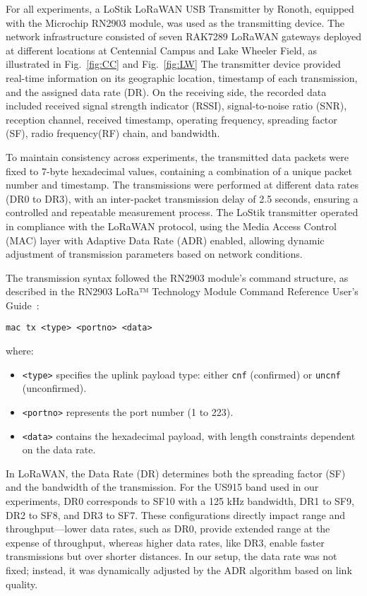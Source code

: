 \documentclass[journal]{IEEEtran}
\begin{document}
For all experiments, a LoStik LoRaWAN USB Transmitter by Ronoth, equipped with the Microchip RN2903 module, was used as the transmitting device. The network infrastructure consisted of seven RAK7289 LoRaWAN gateways deployed at different locations at Centennial Campus and Lake Wheeler Field, as illustrated in Fig.~\ref{fig:CC} and Fig.~\ref{fig:LW} The transmitter device provided real-time information on its geographic location, timestamp of each transmission, and the assigned data rate (DR). On the receiving side, the recorded data included received signal strength indicator (RSSI), signal-to-noise ratio (SNR), reception channel, received timestamp, operating frequency, spreading factor (SF), radio frequency(RF) chain, and bandwidth.

To maintain consistency across experiments, the transmitted data packets were fixed to 7-byte hexadecimal values, containing a combination of a unique packet number and timestamp. The transmissions were performed at different data rates (DR0 to DR3), with an inter-packet transmission delay of 2.5 seconds, ensuring a controlled and repeatable measurement process. The LoStik transmitter operated in compliance with the LoRaWAN protocol, using the Media Access Control (MAC) layer with Adaptive Data Rate (ADR) enabled, allowing dynamic adjustment of transmission parameters based on network conditions.

The transmission syntax followed the RN2903 module's command structure, as described in the RN2903 LoRa™ Technology Module Command Reference User’s Guide~\cite{Microchip2018RN2903_Reference}:

\begin{verbatim}
mac tx <type> <portno> <data>
\end{verbatim}

where:
\begin{itemize}
    \item \texttt{<type>} specifies the uplink payload type: either \texttt{cnf} (confirmed) or \texttt{uncnf} (unconfirmed).
    \item \texttt{<portno>} represents the port number (1 to 223).
    \item \texttt{<data>} contains the hexadecimal payload, with length constraints dependent on the data rate.
\end{itemize}

In LoRaWAN, the Data Rate (DR) determines both the spreading factor (SF) and the bandwidth of the transmission. For the US915 band used in our experiments, DR0 corresponds to SF10 with a 125 kHz bandwidth, DR1 to SF9, DR2 to SF8, and DR3 to SF7. These configurations directly impact range and throughput—lower data rates, such as DR0, provide extended range at the expense of throughput, whereas higher data rates, like DR3, enable faster transmissions but over shorter distances. In our setup, the data rate was not fixed; instead, it was dynamically adjusted by the ADR algorithm based on link quality.
\end{document}
